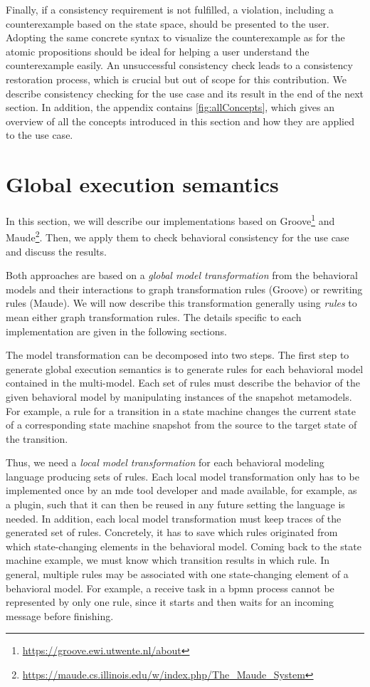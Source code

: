 \documentclass{jot}
\begin{document}
Finally, if a consistency requirement is not fulfilled, a violation, including a counterexample based on the state space, should be presented to the user.
Adopting the same concrete syntax to visualize the counterexample as for the atomic propositions should be ideal for helping a user understand the counterexample easily. 
An unsuccessful consistency check leads to a consistency restoration process, which is crucial but out of scope for this contribution.
We describe consistency checking for the use case and its result in the end of the next section.
In addition, the appendix contains \autoref{fig:allConcepts}, which gives an overview of all the concepts introduced in this section and how they are applied to the use case.

\section{Global execution semantics} \label{sec:global_execution_semantics}
In this section, we will describe our implementations based on Groove\footnote{\url{https://groove.ewi.utwente.nl/about}} and Maude\footnote{\url{https://maude.cs.illinois.edu/w/index.php/The_Maude_System}}.
Then, we apply them to check behavioral consistency for the use case and discuss the results.

Both approaches are based on a \textit{global model transformation} from the behavioral models and their interactions to graph transformation rules (Groove) or rewriting rules (Maude).
We will now describe this transformation generally using \textit{rules} to mean either graph transformation rules.
The details specific to each implementation are given in the following sections.

The model transformation can be decomposed into two steps.
The first step to generate global execution semantics is to generate rules for each behavioral model contained in the multi-model.
Each set of rules must describe the behavior of the given behavioral model by manipulating instances of the snapshot metamodels.
For example, a rule for a transition in a state machine changes the current state of a corresponding state machine snapshot from the source to the target state of the transition. 

Thus, we need a \emph{local model transformation} for each behavioral modeling language producing sets of rules.
Each local model transformation only has to be implemented once by an \gls*{mde} tool developer and made available, for example, as a plugin, such that it can then be reused in any future setting the language is needed.
In addition, each local model transformation must keep traces of the generated set of rules.
Concretely, it has to save which rules originated from which state-changing elements in the behavioral model.
Coming back to the state machine example, we must know which transition results in which rule.
In general, multiple rules may be associated with one state-changing element of a behavioral model.
For example, a receive task in a \gls*{bpmn} process cannot be represented by only one rule, since it starts and then waits for an incoming message before finishing.
\end{document}
